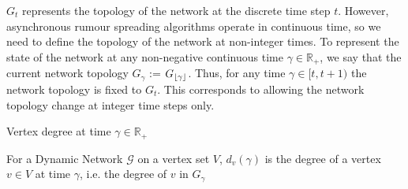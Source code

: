 $G_t$ represents the topology of the network at the discrete time step $t$. However, asynchronous rumour spreading algorithms operate in continuous time, so we need to define the topology of the network at non-integer times. To represent the state of the network at any non-negative continuous time $\gamma \in \mathbb{R}_+$, we say that the current network topology $G_\gamma$ := $G_{\lfloor\gamma\rfloor}$. Thus, for any time $\gamma \in [t, t + 1)$ the network topology is fixed to $G_t$. This corresponds to allowing the network topology change at integer time steps only.


\begin{definition}
	Vertex degree at time $\gamma \in \mathbb{R}_+ $ 

	\noindent
	For a Dynamic Network $\mathcal{G}$ on a vertex set $V$, $d_v(\gamma)$ is the degree of a vertex $v \in V$ at time $\gamma$, i.e. the degree of $v$ in $G_\gamma$
\end{definition}




